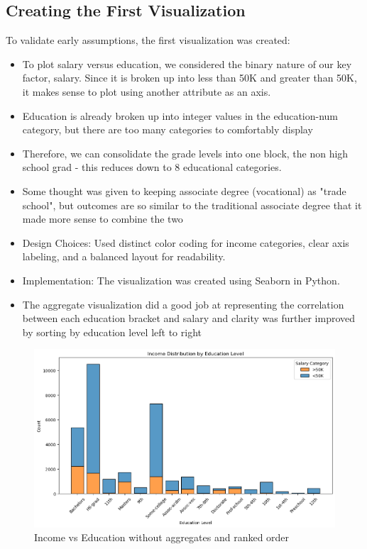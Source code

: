 \documentclass[journal,onecolumn]{IEEEtran}
\begin{document}
\subsection{Creating the First Visualization}
To validate early assumptions, the first visualization was created:
\begin{itemize}
    \item To plot salary versus education, we considered the binary nature of our key factor, salary. Since it is broken up into less than 50K and greater than 50K, it makes sense to plot using another attribute as an axis.
    \item Education is already broken up into integer values in the education-num category, but there are too many categories to comfortably display
    \item Therefore, we can consolidate the grade levels into one block, the non high school grad - this reduces down to 8 educational categories.
    \item Some thought was given to keeping associate degree (vocational) as "trade school", but outcomes are so similar to the traditional associate degree that it made more sense to combine the two
    \item Design Choices: Used distinct color coding for income categories, clear axis labeling, and a balanced layout for readability.
    \item Implementation: The visualization was created using Seaborn in Python.
    \item The aggregate visualization did a good job at representing the correlation between each education bracket and salary and clarity was further improved by sorting by education level left to right
\end{itemize}


\begin{figure}[t]
    \centering
    \includegraphics[width=0.9\linewidth]{hist_bad.png}  %
    \caption{Income vs Education without aggregates and ranked order}
    \label{fig:income_vs_education_no_agg}
\end{figure}
\end{document}
